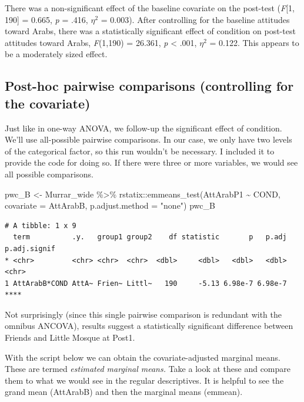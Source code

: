 \documentclass[
  11pt,
]{book}
\newenvironment{Shaded}{\begin{snugshade}}{\end{snugshade}}
\newcommand{\AttributeTok}[1]{\textcolor[rgb]{0.77,0.63,0.00}{#1}}
\newcommand{\FunctionTok}[1]{\textcolor[rgb]{0.00,0.00,0.00}{#1}}
\newcommand{\NormalTok}[1]{#1}
\newcommand{\OtherTok}[1]{\textcolor[rgb]{0.56,0.35,0.01}{#1}}
\newcommand{\SpecialCharTok}[1]{\textcolor[rgb]{0.00,0.00,0.00}{#1}}
\newcommand{\StringTok}[1]{\textcolor[rgb]{0.31,0.60,0.02}{#1}}
\begin{document}
There was a non-significant effect of the baseline covariate on the post-test (\emph{F}{[}1, 190{]} = 0.665, \emph{p} = .416, \(\eta^2\) = 0.003). After controlling for the baseline attitudes toward Arabs, there was a statistically significant effect of condition on post-test attitudes toward Arabs, \emph{F}(1,190) = 26.361, \emph{p} \textless{} .001, \(\eta^2\) = 0.122. This appears to be a moderately sized effect.

\hypertarget{post-hoc-pairwise-comparisons-controlling-for-the-covariate}{%
\subsection{Post-hoc pairwise comparisons (controlling for the covariate)}\label{post-hoc-pairwise-comparisons-controlling-for-the-covariate}}

Just like in one-way ANOVA, we follow-up the significant effect of condition. We'll use all-possible pairwise comparisons. In our case, we only have two levels of the categorical factor, so this run wouldn't be necessary. I included it to provide the code for doing so. If there were three or more variables, we would see all possible comparisons.

\begin{Shaded}
\begin{Highlighting}[]
\NormalTok{pwc\_B }\OtherTok{\textless{}{-}}\NormalTok{ Murrar\_wide }\SpecialCharTok{\%\textgreater{}\%}
\NormalTok{    rstatix}\SpecialCharTok{::}\FunctionTok{emmeans\_test}\NormalTok{(AttArabP1 }\SpecialCharTok{\textasciitilde{}}\NormalTok{ COND, }\AttributeTok{covariate =}\NormalTok{ AttArabB, }\AttributeTok{p.adjust.method =} \StringTok{"none"}\NormalTok{)}
\NormalTok{pwc\_B}
\end{Highlighting}
\end{Shaded}

\begin{verbatim}
# A tibble: 1 x 9
  term          .y.   group1 group2    df statistic       p   p.adj p.adj.signif
* <chr>         <chr> <chr>  <chr>  <dbl>     <dbl>   <dbl>   <dbl> <chr>       
1 AttArabB*COND AttA~ Frien~ Littl~   190     -5.13 6.98e-7 6.98e-7 ****        
\end{verbatim}

Not surprisingly (since this single pairwise comparison is redundant with the omnibus ANCOVA), results suggest a statistically significant difference between Friends and Little Mosque at Post1.

With the script below we can obtain the covariate-adjusted marginal means. These are termed \emph{estimated marginal means.} Take a look at these and compare them to what we would see in the regular descriptives. It is helpful to see the grand mean (AttArabB) and then the marginal means (emmean).
\end{document}

